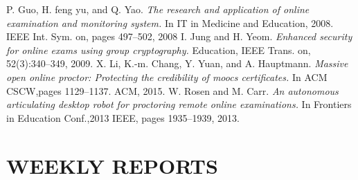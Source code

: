 \documentclass[12pt]{report}
\begin{document}
\begin{thebibliography}{9}
 P. Guo, H. feng yu, and Q. Yao. 
\textit{The research and application of online
examination and monitoring system.}
 In IT in Medicine and Education,
2008. IEEE Int. Sym. on, pages 497–502, 2008
 I. Jung and H. Yeom.
\textit{ Enhanced security for online exams using group
cryptography.}
 Education, IEEE Trans. on, 52(3):340–349, 2009.
X. Li, K.-m. Chang, Y. Yuan, and A. Hauptmann.
\textit{ Massive open online
proctor: Protecting the credibility of moocs certificates.}
 In ACM CSCW,pages 1129–1137. ACM, 2015.
W. Rosen and M. Carr. 
\textit{An autonomous articulating desktop robot for proctoring remote online examinations.}
In Frontiers in Education Conf.,2013 IEEE, pages 1935–1939, 2013.

\end{thebibliography}

\newpage
\chapter*{WEEKLY REPORTS}
\newpage
\end{document}
